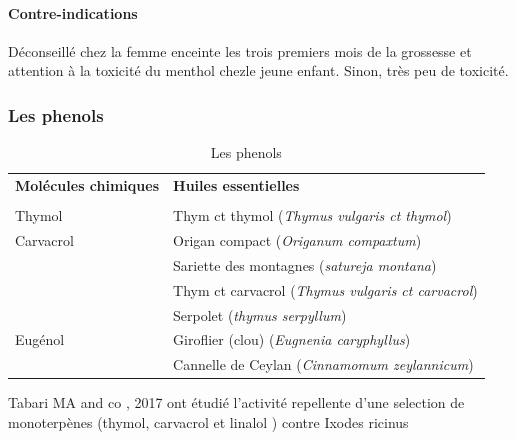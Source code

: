 \documentclass[12pt,a4wide]{article}
\begin{document}
\paragraph{Contre-indications}
\label{sec-4-3-1-1}
Déconseillé chez  la femme enceinte les  trois premiers mois de  la grossesse et
attention  à la  toxicité du  menthol chezle  jeune enfant.  Sinon, très  peu de
toxicité.



\subsubsection{Les phenols}
\label{sec-4-3-2}

\begin{table}[htb]
\caption{Les phenols}
\centering
\begin{tabular}{ll}
\textbf{Molécules chimiques} & \textbf{Huiles essentielles}\\
 & \\
\hline
Thymol & Thym ct thymol (\emph{Thymus vulgaris ct thymol})\\
\hline
Carvacrol & Origan compact (\emph{Origanum compaxtum})\\
 & Sariette des montagnes (\emph{satureja montana})\\
 & Thym ct carvacrol (\emph{Thymus vulgaris ct carvacrol})\\
 & Serpolet (\emph{thymus serpyllum})\\
\hline
Eugénol & Giroflier (clou) (\emph{Eugnenia caryphyllus})\\
 & Cannelle de Ceylan (\emph{Cinnamomum zeylannicum})\\
\hline
\end{tabular}
\end{table}


Tabari MA and co , 2017 ont étudié l'activité repellente d'une selection de monoterpènes (thymol, carvacrol et linalol ) contre Ixodes ricinus
\end{document}
